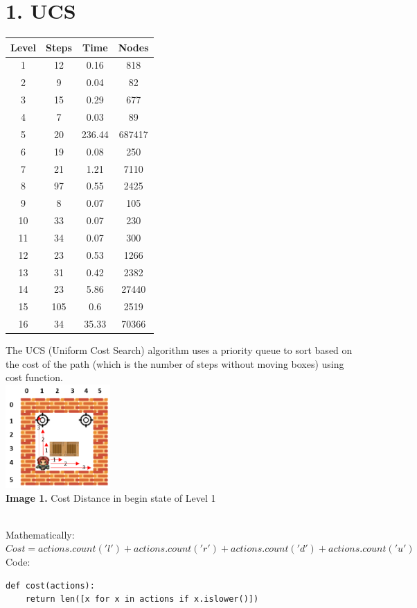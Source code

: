 \documentclass[english, a4paper,12pt]{article}
\begin{document}
\section*{1. UCS}
\small\begin{minipage}{.35\textwidth}
\begin{tabular}{|c|c|c|c|}
\hline
Level & Steps & Time & Nodes  \\
\hline
1 & 12 & 0.16 & 818\\
2 & 9 & 0.04 & 82\\
3 & 15 & 0.29 & 677 \\
4 & 7 & 0.03 & 89\\
5 & 20 & 236.44 & 687417 \\
6 & 19 & 0.08 & 250\\
7 & 21 & 1.21 & 7110\\
8 & 97 & 0.55 & 2425\\
9 & 8 & 0.07 & 105\\
10 & 33 & 0.07 & 230\\
11 & 34  & 0.07 & 300\\
12 & 23 & 0.53 & 1266\\
13 & 31 & 0.42 & 2382\\
14 & 23 & 5.86 & 27440\\
15 & 105 & 0.6 & 2519\\
16 & 34 & 35.33 & 70366 \\
\hline
\end{tabular}
\end{minipage}
\begin{minipage}{.7\textwidth}
The UCS (Uniform Cost Search) algorithm uses a priority queue to sort based on the cost of the path (which is the number of steps without moving boxes) using cost function.\\
\hspace*{35mm}\includegraphics[width=4cm]{Level1_UCS.png}\\
\hspace*{10mm}\textbf{Image 1.} Cost Distance in begin state of Level 1
\end{minipage}
\vspace*{3mm}
\\
Mathematically:
\vspace*{3mm}\\
\hspace*{5mm}$Cost = actions.count('l') + actions.count('r') + actions.count('d') + actions.count('u')$
\vspace*{3mm}
\\
Code:
\small\begin{verbatim}
def cost(actions):
    return len([x for x in actions if x.islower()])
\end{verbatim}
\end{document}
